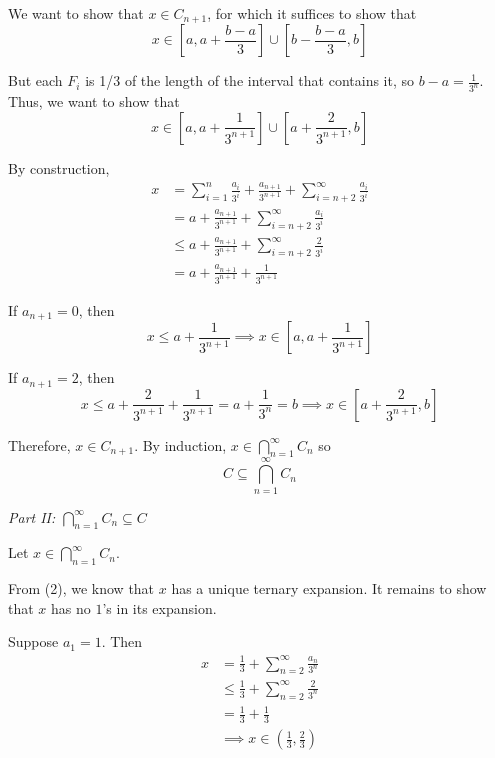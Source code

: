 \documentclass[12pt]{article}
\newcommand{\sub}{\subseteq}
\begin{document}
\begin{itemize}
            We want to show that $x \in C_{n+1}$, for which it suffices to show that 
            \[x \in [a, a + \frac{b - a}{3}] \cup [b - \frac{b - a}{3}, b]\]

            But each $F_i$ is 1/3 of the length of the interval that contains it, so $b-a = \frac{1}{3^n}$. Thus, we want to show that 
            \[x \in [a, a + \frac{1}{3^{n+1}}] \cup [a + \frac{2}{3^{n+1}}, b]\]

            By construction,  
            \begin{align*}
                x &= \sum_{i=1}^n \frac{a_i}{3^i} + \frac{a_{n+1}}{3^{n+1}} +\sum_{i=n+2}^{\infty} \frac{a_i}{3^i}\\ 
                    &= a + \frac{a_{n+1}}{3^{n+1}} + \sum_{i=n+2}^{\infty} \frac{a_i}{3^i}\\ 
                    &\leq a + \frac{a_{n+1}}{3^{n+1}} + \sum_{i=n+2}^{\infty} \frac{2}{3^i}\\ 
                    &= a + \frac{a_{n+1}}{3^{n+1}} +  \frac{1}{3^{n+1}}
            \end{align*}

            If $a_{n+1} = 0$, then 
            \[x \leq a + \frac{1}{3^{n+1}} \implies x \in [a, a + \frac{1}{3^{n+1}}]\]

            If $a_{n+1} = 2$, then
            \[x \leq a + \frac{2}{3^{n+1}} +  \frac{1}{3^{n+1}} = a + \frac{1}{3^n} = b \implies x \in [a + \frac{2}{3^{n+1}}, b]\]

            Therefore, $x \in C_{n+1}$. By induction, $x \in \bigcap_{n=1}^{\infty} C_n$ so 
            \[C \sub \bigcap_{n=1}^{\infty} C_n\]
            
            \emph{Part II: $\bigcap_{n=1}^{\infty} C_n \sub C$} 
            
            Let $x \in \bigcap_{n=1}^{\infty} C_n$. 

            From (2), we know that $x$ has a unique ternary expansion. It remains to show that $x$ has no $1$'s in its expansion.

            Suppose $a_1 = 1$. Then 
            \begin{align*}
                x &= \frac{1}{3} + \sum_{n=2}^{\infty} \frac{a_n}{3^n}\\
                &\leq \frac{1}{3} + \sum_{n=2}^{\infty} \frac{2}{3^n}\\
                &= \frac{1}{3} + \frac{1}{3}\\ 
                &\implies x \in (\frac{1}{3}, \frac{2}{3})
            \end{align*}


\end{itemize}
\end{document}
